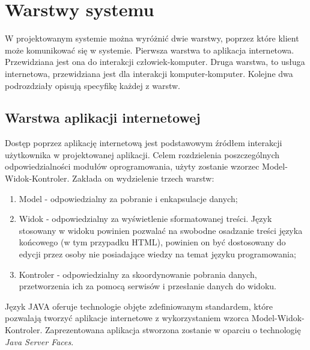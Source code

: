 




\section{Warstwy systemu}
W projektowanym systemie można wyróżnić dwie warstwy, poprzez które klient może komunikować się w systemie. Pierwsza warstwa to aplikacja internetowa. Przewidziana jest ona do interakcji człowiek-komputer. Druga warstwa, to usługa internetowa, przewidziana jest dla interakcji komputer-komputer. Kolejne dwa podrozdziały opisują specyfikę każdej z warstw.
\subsection{Warstwa aplikacji internetowej}
Dostęp poprzez aplikację internetową jest podstawowym źródłem interakcji użytkownika w projektowanej aplikacji. Celem rozdzielenia poszczególnych odpowiedzialności modułów oprogramowania, użyty zostanie wzorzec Model-Widok-Kontroler. Zakłada on wydzielenie trzech warstw:
\begin{enumerate}
  \item Model - odpowiedzialny za pobranie i enkapsulacje danych;
  \item Widok - odpowiedzialny za wyświetlenie sformatowanej treści. Język stosowany w widoku powinien pozwalać na swobodne osadzanie treści języka końcowego (w tym przypadku HTML), powinien on być dostosowany do edycji przez osoby nie posiadające wiedzy na temat języku programowania;
  \item Kontroler - odpowiedzialny za skoordynowanie pobrania danych, przetworzenia ich za pomocą serwisów i przesłanie danych do widoku.
\end{enumerate}

Język JAVA oferuje technologie objęte zdefiniowanym standardem, które pozwalają tworzyć aplikacje internetowe z wykorzystaniem wzorca Model-Widok-Kontroler. Zaprezentowana aplikacja stworzona zostanie w oparciu o technologię \textit{Java Server Faces}.

